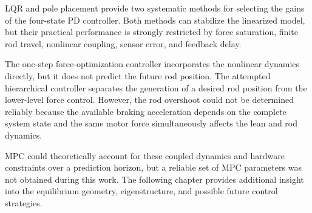 LQR and pole placement provide two systematic methods for selecting the gains of the four-state PD controller. Both methods can stabilize the linearized model, but their practical performance is strongly restricted by force saturation, finite rod travel, nonlinear coupling, sensor error, and feedback delay.

The one-step force-optimization controller incorporates the nonlinear dynamics directly, but it does not predict the future rod position. The attempted hierarchical controller separates the generation of a desired rod position from the lower-level force control. However, the rod overshoot could not be determined reliably because the available braking acceleration depends on the complete system state and the same motor force simultaneously affects the lean and rod dynamics.

MPC could theoretically account for these coupled dynamics and hardware constraints over a prediction horizon, but a reliable set of MPC parameters was not obtained during this work. The following chapter provides additional insight into the equilibrium geometry, eigenstructure, and possible future control strategies.